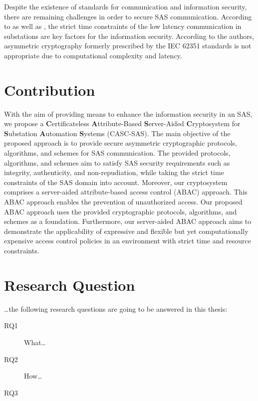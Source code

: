 Despite the existence of standards for communication and information security, there are remaining challenges in order to secure SAS communication.
According to \citeauthor{Ishchenko2018} \cite{Ishchenko2018} as well as \citeauthor{Elbez2019} \cite{Elbez2019}, the strict time constraints of the low latency communication in substations are key factors for the information security.
According to the authors, asymmetric cryptography formerly prescribed by the IEC 62351 standards is not appropriate due to computational complexity and latency.

\section{Contribution}
\label{sec:contribution}
With the aim of providing means to enhance the information security in an SAS, we propose a \textbf{C}ertificateless \textbf{A}ttribute-Based \textbf{S}erver-Aided \textbf{C}ryptosystem for \textbf{S}ubstation \textbf{A}utomation \textbf{S}ystems (CASC-SAS).
The main objective of the proposed approach is to provide secure asymmetric cryptographic protocols, algorithms, and schemes for SAS communication.
The provided protocols, algorithms, and schemes aim to satisfy SAS security requirements such as integrity, authenticity, and non-repudiation, while taking the strict time constraints of the SAS domain into account.
Moreover, our cryptosystem comprises a server-aided attribute-based access control (ABAC) approach.
This ABAC approach enables the prevention of unauthorized access.
Our proposed ABAC approach uses the provided cryptographic protocols, algorithms, and schemes as a foundation.
Furthermore, our server-aided ABAC approach aims to demonstrate the applicability of expressive and flexible but yet computationally expensive access control policies in an environment with strict time and resource constraints.

\section{Research Question}
\label{sec:research_question}
\dots the following research questions are going to be answered in this thesis:
\begin{description}
    \item[RQ1] What\dots\\
    \item[RQ2] How\dots\\
    \item[RQ3] 
\end{description}
